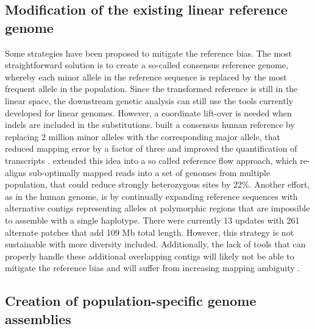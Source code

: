 \documentclass[../main.tex]{subfiles}
\begin{document}
\subsection*{Modification of the existing linear reference genome}

Some strategies have been proposed to mitigate the reference bias. The most straightforward solution is to create a so-called consensus reference genome, whereby each minor allele in the reference sequence is replaced by the most frequent allele in the population. Since the transformed reference is still in the linear space, the downstream genetic analysis can still use the tools currently developed for linear genomes. However, a coordinate lift-over is needed when indels are included in the substitutions. \citet{ballouz2019time} built a consensus human reference by replacing 2 million minor alleles with the corresponding major allele, that reduced mapping error by a factor of three and improved the quantification of transcripts \citep{kaminow2020virtue}. \citet{chen2021reference} extended this idea into a so called reference flow approach, which re-aligns sub-optimally mapped reads into a set of genomes from multiple population, that could reduce strongly heterozygous sites by 22\%. Another effort, as in the human genome, is by continually expanding reference sequences with alternative contigs representing alleles at polymorphic regions that are impossible to assemble with a single haplotype. There were currently 13 updates with 261 alternate patches that add 109 Mb total length. However, this strategy is not sustainable with more diversity included. Additionally, the lack of tools that can properly handle these additional overlapping contigs will likely not be able to mitigate the reference bias and will suffer from increasing mapping ambiguity \citep{sherman2020pan}. 

\subsection*{Creation of population-specific genome assemblies}
\end{document}
